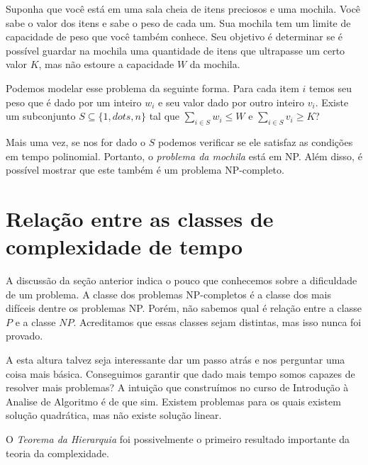 \begin{example}
  Suponha que você está em uma sala cheia de itens preciosos e uma mochila.
  Você sabe o valor dos itens e sabe o peso de cada um.
  Sua mochila tem um limite de capacidade de peso que você também conhece.
  Seu objetivo é determinar se é possível guardar na mochila uma quantidade de itens que ultrapasse um certo valor $K$, mas não estoure a capacidade $W$ da mochila.

  Podemos modelar esse problema da seguinte forma.
  Para cada item $i$ temos seu peso que é dado por um inteiro $w_i$ e seu valor dado por outro inteiro $v_i$.
  Existe um subconjunto $S \subseteq \{1, dots, n\}$ tal que $\sum_{i \in S} w_i \leq W$ e $\sum_{i \in S} v_i \geq K$?

  Mais uma vez, se nos for dado o $S$ podemos verificar se ele satisfaz as condições em tempo polinomial.
  Portanto, o {\em problema da mochila} está em NP.
  Além disso, é possível mostrar que este também é um problema NP-completo.
\end{example}


\section{Relação entre as classes de complexidade de tempo}
\label{sec:hierarquia}

A discussão da seção anterior indica o pouco que conhecemos sobre a dificuldade de um problema.
A classe dos problemas NP-completos é a classe dos mais difíceis dentre os problemas NP.
Porém, não sabemos qual é relação entre a classe $P$ e a classe $NP$.
Acreditamos que essas classes sejam distintas, mas isso nunca foi provado.

A esta altura talvez seja interessante dar um passo atrás e nos perguntar uma coisa mais básica.
Conseguimos garantir que dado mais tempo somos capazes de resolver mais problemas?
A intuição que construímos no curso de Introdução à Analise de Algoritmo é de que sim.
Existem problemas para os quais existem solução quadrática, mas não existe solução linear.

O {\em Teorema da Hierarquia} foi possivelmente o primeiro resultado importante da teoria da complexidade.

